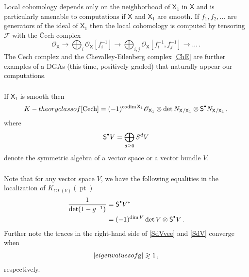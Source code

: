 \documentclass[14pt]{extarticle}
\newcommand{\bX}{\mathsf{X}}
\newcommand{\cF}{\mathscr{F}}
\newcommand{\bS}{\mathsf{S}}
\newcommand{\cO}{\mathscr{O}}
\newcommand{\Sd}{{\bS}^{\raisebox{0.5mm}{$\scriptscriptstyle \bullet$}}}
\DeclareMathOperator{\pt}{pt}
\DeclareMathOperator{\codim}{codim}
\theoremstyle{definition}
\begin{document}
\subsubsection{}\label{s_weights_loc_coh} 

Local cohomology depends only on the neighborhood of $\bX_1$ in $\bX$ and
is particularly amenable to  computations if $\bX$ and  $\bX_1$ are smooth. If
$f_1,f_2, \dots$ are generators of the ideal of $\bX_1$ then the local
cohomology is computed by tensoring $\cF$ with the \v{C}ech complex
%
\begin{equation}
\cO_\bX \to \bigoplus_i  \cO_\bX \left[f_i^{-1}\right] \to  \bigoplus_{i,j}
  \cO_\bX \left[f_i^{-1},
    f_j^{-1}\right] \to \dots \,. \label{Cech}
\end{equation}
%
The Cech complex and the Chevalley-Eilenberg complex \eqref{ChE} are further examples of a DGAs (this time, positively
graded) that naturally appear our computations.

\subsubsection{} 


If $\bX_1$ is smooth then
%
\begin{equation}
  \label{eq:9}
  \textup{K-theory class of \eqref{Cech}} = (-1)^{\codim \bX_1}
  \cO_{\bX_1} \otimes \det{N_{\bX/\bX_1}} \otimes \Sd N_{\bX/\bX_1} \,, 
\end{equation}
%
where
\[
  \Sd V = 
\bigoplus_{d\ge 0} S^d V
\]
denote the symmetric algebra of a vector space or a vector bundle $V$.

\subsubsection{}

Note that for any vector space $V$, we have the following equalities 
in the localization of $K_{GL(V)}(\pt)$
%
\begin{align}
  \frac{1}{\det(1-g^{-1})} & = \Sd V^* \label{SdVvee} \\
                                    & = (-1)^{\dim V} \det V \otimes
                                      \Sd V  \label{SdV}  \,. 
\end{align}
%
Further note the traces in the right-hand side of \eqref{SdVvee}
and \eqref{SdV} converge when
\[
  | \textup{eigenvalues of $g$} |  \gtrless 1 \,,
\]
respectively.

\subsubsection{}\label{s_oBB} 
\end{document}
